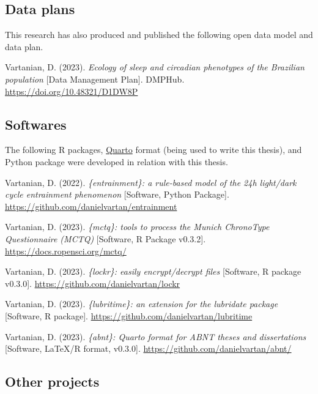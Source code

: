 \documentclass[
12pt,
openright,
oneside,
a4paper,
chapter=TITLE,
section=TITLE,
french,
spanish,
brazil,
english
]{abntex2}\usepackage{array}
\newcommand{\microskip}{\vspace{\microskipamount}}
\begin{document}
\subsection{Data plans}\label{data-plans}

This research has also produced and published the following open data
model and data plan.

\smallskip

\noindent Vartanian, D. (2023). \emph{Ecology of sleep and circadian
phenotypes of the Brazilian population} {[}Data Management Plan{]}.
DMPHub. \url{https://doi.org/10.48321/D1DW8P}

\subsection{Softwares}\label{softwares}

The following R packages, \href{https://quarto.org/}{Quarto} format
(being used to write this thesis), and Python package were developed in
relation with this thesis.

\smallskip

\noindent Vartanian, D. (2022). \emph{\{entrainment\}: a rule-based
model of the 24h light/dark cycle entrainment phenomenon} {[}Software,
Python Package{]}. \url{https://github.com/danielvartan/entrainment}

\microskip

\noindent Vartanian, D. (2023). \emph{\{mctq\}: tools to process the
Munich ChronoType Questionnaire (MCTQ)} {[}Software, R Package
v0.3.2{]}. \url{https://docs.ropensci.org/mctq/}

\microskip

\noindent Vartanian, D. (2023). \emph{\{lockr\}: easily encrypt/decrypt
files} {[}Software, R package v0.3.0{]}.
\url{https://github.com/danielvartan/lockr}

\microskip

\noindent Vartanian, D. (2023). \emph{\{lubritime\}: an extension for
the lubridate package} {[}Software, R package{]}.
\url{https://github.com/danielvartan/lubritime}

\microskip

\noindent Vartanian, D. (2023). \emph{\{abnt\}: Quarto format for ABNT
theses and dissertations} {[}Software, LaTeX/R format, v0.3.0{]}.
\url{https://github.com/danielvartan/abnt/}

\subsection{Other projects}\label{other-projects}
\end{document}
